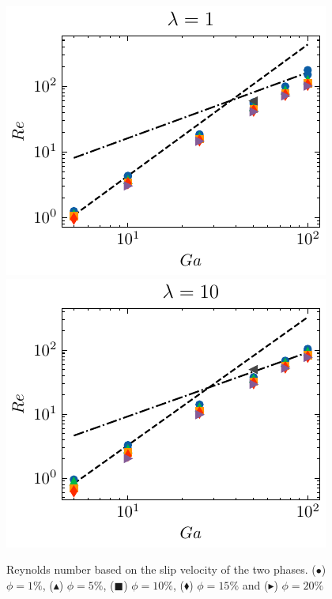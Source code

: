 \begin{figure}
\centering
    \includegraphics[height = 0.35\textwidth]{image/HOMOGENEOUS/fCA/Re_N_5_l_1.pdf}
    \includegraphics[height = 0.35\textwidth]{image/HOMOGENEOUS/fCA/Re_N_5_l_10.pdf}
    \caption{Reynolds number based on the slip velocity of the two phases. ($\bullet$) $\phi = 1\%$, ($\blacktriangle$) $\phi = 5\%$, ($\blacksquare$) $\phi = 10\%$, ($\blacklozenge$) $\phi = 15\%$ and ($\blacktriangleright$) $\phi = 20\%$}
    \label{fig:Re_Ga}
\end{figure}
 




